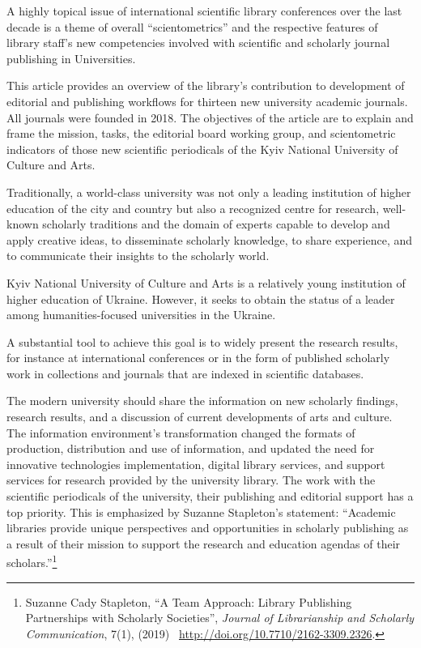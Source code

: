 \documentclass[a4paper,
fontsize=11pt,
oneside,
numbers=noperiodatend,
parskip=half-,
bibliography=totoc,
final
]{scrartcl}
\begin{document}
A highly topical issue of international scientific library conferences
over the last decade is a theme of overall \enquote{scientometrics} and
the respective features of library staff's new competencies involved
with scientific and scholarly journal publishing in Universities.

This article provides an overview of the library's contribution to
development of editorial and publishing workflows for thirteen new
university academic journals. All journals were founded in 2018. The
objectives of the article are to explain and frame the mission, tasks,
the editorial board working group, and scientometric indicators of those
new scientific periodicals of the Kyiv National University of Culture
and Arts.

Traditionally, a world-class university was not only a leading
institution of higher education of the city and country but also a
recognized centre for research, well-known scholarly traditions and the
domain of experts capable to develop and apply creative ideas, to
disseminate scholarly knowledge, to share experience, and to communicate
their insights to the scholarly world.

Kyiv National University of Culture and Arts is a relatively young
institution of higher education of Ukraine. However, it seeks to obtain
the status of a leader among humanities-focused universities in the
Ukraine.

A substantial tool to achieve this goal is to widely present the
research results, for instance at international conferences or in the
form of published scholarly work in collections and journals that are
indexed in scientific databases.

The modern university should share the information on new scholarly
findings, research results, and a discussion of current developments of
arts and culture. The information environment's transformation changed
the formats of production, distribution and use of information, and
updated the need for innovative technologies implementation, digital
library services, and support services for research provided by the
university library. The work with the scientific periodicals of the
university, their publishing and editorial support has a top priority.
This is emphasized by Suzanne Stapleton's statement: \enquote{Academic
libraries provide unique perspectives and opportunities in scholarly
publishing as a result of their mission to support the research and
education agendas of their scholars.}\footnote{Suzanne Cady Stapleton,
  \enquote{A Team Approach: Library Publishing Partnerships with
  Scholarly Societies}, \emph{Journal of Librarianship and Scholarly
  Communication}, 7(1), (2019)
  ~\url{http://doi.org/10.7710/2162-3309.2326}.}
\end{document}
